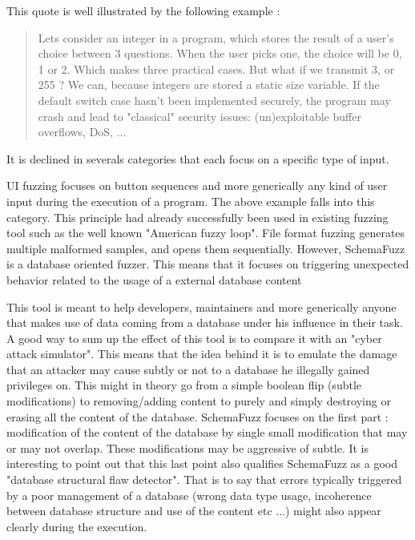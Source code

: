 \documentclass{article}
\begin{document}
\begin{empfile}
This quote is   well illustrated by the following example :
				\begin{quotation}
Lets consider an integer in a program, which stores the result of a user's choice between 3 questions. When the user picks one, the choice will be 0, 1 or 2. Which makes three practical cases. But what if we transmit 3, or 255 ? We can, because integers are stored a static size variable. If the default switch case hasn't been implemented securely, the program may crash and lead to "classical" security issues: (un)exploitable buffer overflows, DoS, ... 
				\end{quotation}

It is declined in severals categories that each focus on a specific type of input.
 
UI fuzzing focuses on button sequences and more generically any kind of user input during the execution of a program. The above example falls into this category.
This principle had already successfully been used in existing fuzzing tool such as the well known "American fuzzy loop".
File format fuzzing generates multiple malformed samples, and opens them sequentially.
However, SchemaFuzz is a database oriented fuzzer. This means that it focuses on triggering unexpected behavior related to the usage of a external database content   

This tool is meant to help developers, maintainers and more generically anyone that makes use of data coming from a database under his influence in their task. A good way to sum up the effect of this tool is to compare it with an "cyber attack simulator".
This means that the idea behind it is to emulate the damage that an attacker may cause subtly or not to a database he illegally gained privileges on. This might in theory go from a simple boolean flip (subtle modifications) to removing/adding content to purely and simply destroying or erasing all the content of the database.
SchemaFuzz focuses on the first part : modification of the content of the database by single small modification that may or may not overlap. These modifications may be   aggressive of   subtle.
It is interesting to point out that this last point also qualifies SchemaFuzz as a good "database structural flaw detector".
That is to say that errors typically triggered by a poor management of a database (wrong data type usage, incoherence between database structure and use of the content etc ...) might also appear clearly during the execution.   

\end{empfile}
\end{document}
